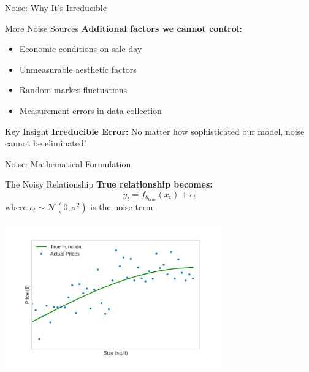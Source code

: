 \documentclass[10pt]{beamer}
\newcommand{\fitpic}[1]{\begin{adjustbox}{max width=\linewidth, max totalheight=0.78\textheight}#1\end{adjustbox}}
\begin{document}
\begin{frame}{Noise: Why It's Irreducible}
\begin{examplebox}{More Noise Sources}
\textbf{Additional factors we cannot control:}
\begin{itemize}
\item Economic conditions on sale day
\item Unmeasurable aesthetic factors
\item Random market fluctuations
\item Measurement errors in data collection
\end{itemize}
\end{examplebox}

\begin{alertbox}{Key Insight}
\textbf{Irreducible Error:} No matter how sophisticated our model, noise cannot be eliminated!
\end{alertbox}
\end{frame}

\begin{frame}{Noise: Mathematical Formulation}
\begin{keypointsbox}{The Noisy Relationship}
\textbf{True relationship becomes:}
$$y_t = f_{\theta_{\text{true}}}(x_t) + \epsilon_t$$
where $\epsilon_t \sim \mathcal{N}(0, \sigma^2)$ is the noise term
\end{keypointsbox}

\begin{center}
\fitpic{\includegraphics[width=0.7\textwidth]{../assets/bias-variance/figures/data.pdf}}
\end{center}
\end{frame}
\end{document}
